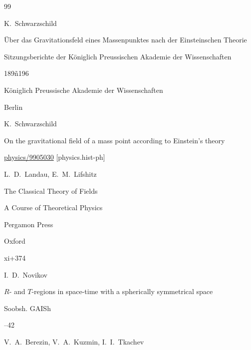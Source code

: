 \begin{thebibliography}{99}

\by K.~Schwarzschild

\paper \"Uber das Gravitationsfeld eines Massenpunktes nach der Einsteinschen Theorie

\inbook Sitzungsberichte der K\"oniglich Preussischen Akademie der Wissenschaften


\pages 189ñ196

\publ K\"oniglich Preussische Akademie der Wissenschaften

\publaddr Berlin


\transl

\by K.~Schwarzschild

\preprint On the gravitational field of a mass point according to Einstein's theory

\arxiv \href{http://arxiv.org/abs/physics/9905030}{physics/9905030} [physics.hist-ph]




\by L.~D.~Landau, E.~M.~Lifshitz

\book The Classical Theory of Fields

\serial A Course of Theoretical Physics



\publ Pergamon Press

\publaddr Oxford

\totalpages xi+374





\by I.~D.~Novikov

\paper $R$- and $T$-regions in space-time with a spherically symmetrical space

\jour Soobsh. GAISh




--42





\by V.~A.~Berezin, V.~A.~Kuzmin, I.~I.~Tkachev


\end{thebibliography}
